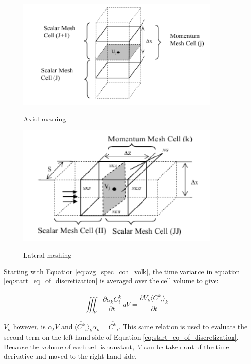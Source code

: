 \begin{figure}[p]
  \centering
  \includegraphics[width=4in]{images/axial_mesh_cells.png}\\
  \caption{Axial meshing.}
  \label{fig:ax_mesh}
\end{figure} 

\begin{figure}[p]
  \centering
  \includegraphics[width=4in]{images/lat_mesh_cells.png}\\
  \caption{Lateral meshing.}
  \label{fig:lat_mesh}
\end{figure} 

\newpage
\FloatBarrier

Starting with Equation \ref{eq:avg_spec_con_volk}, the time variance in equation \ref{eq:start_eq_of_discretization} is averaged over the cell volume to give:

\begin{equation}
    \iiint_{V} \frac{\partial \alpha_{k}C^{k}_{i} }{\partial t}\,dV = \frac{\partial V_{k}\langle \overline{C^{k}}_{i} \rangle_{k}}{\partial t}
\end{equation}

$V_{k}$ however, is $\overline{\alpha}_{k}V$ and $\langle \overline{C^{k}}_{i} \rangle_{k}\overline{\alpha}_{k} = \overline{C^{k}}_{i}$. This same relation is used to evaluate the second term on the left hand-side of Equation \ref{eq:start_eq_of_discretization}. Because the volume of each cell is constant, \textit{V} can be taken out of the time derivative and moved to the right hand side. 

